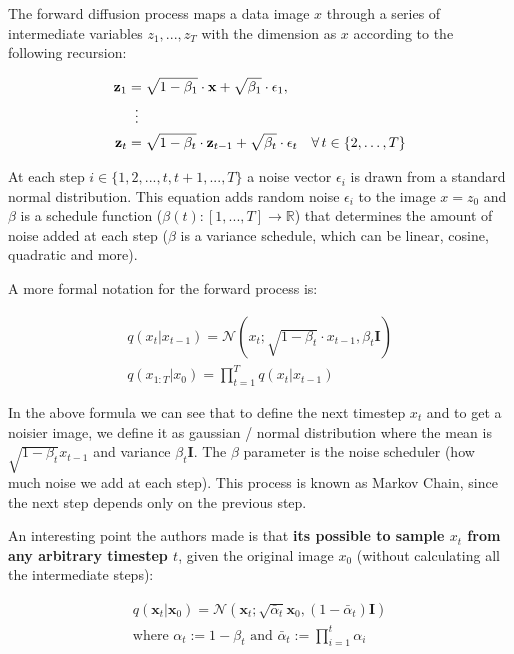 The forward diffusion process maps a data image $x$ through a series of intermediate variables $z_1, ..., z_T$ with the dimension as $x$ according to the following recursion:

\begin{equation}
    \begin{aligned}
    \mathbf{z}_1 &= \sqrt{1 - \beta_1} \cdot \mathbf{x} + \sqrt{\beta_1} \cdot \epsilon_1, \\
    &\;\;\vdots \notag \\
    \mathbf{z}_t &= \sqrt{1 - \beta_t} \cdot \mathbf{z}_{t-1} + \sqrt{\beta_t} \cdot \epsilon_t \quad \forall \, t \in \{2, \ldots, T\}
    \end{aligned}
\end{equation}

At each step $i \in \{1, 2, ..., t, t+1, ..., T\}$ a noise vector $\epsilon_i$ is drawn from a standard normal distribution. This equation adds random noise $\epsilon_i$ to the image $x = z_0$ and $\beta$ is a schedule function ($\beta(t):[1, ..., T] \rightarrow \mathbb{R}$) that determines the amount of noise added at each step ($\beta$ is a variance schedule, which can be linear, cosine, quadratic and more). 

A more formal notation for the forward process is:

\begin{equation*}
    \begin{aligned}
        q(x_t | x_{t-1}) = \mathcal{N}(x_t; \sqrt{1-\beta_t} \cdot x_{t-1}, \beta_t \mathbf{I}) \\
        q(x_{1:T} | x_0) = \prod_{t=1}^{T} q(x_t | x_{t-1})
    \end{aligned}
\end{equation*}

In the above formula we can see that to define the next timestep $x_t$ and to get a noisier image, we define it as gaussian / normal distribution where the mean is $\sqrt{1-\beta_t} x_{t-1}$ and variance $\beta_t \mathbf{I}$. The $\beta$ parameter is the noise scheduler (how much noise we add at each step). This process is known as Markov Chain, since the next step depends only on the previous step.

An interesting point the authors made is that \textbf{its possible to sample $x_t$ from any arbitrary timestep $t$}, given the original image $x_0$ (without calculating all the intermediate steps):

\begin{equation}
    \begin{aligned}
    q(\mathbf{x}_t|\mathbf{x}_0) = \mathcal{N}(\mathbf{x}_t; \sqrt{\bar{\alpha}_t}\mathbf{x}_0, (1 - \bar{\alpha}_t)\mathbf{I}) \\
    \text{where } \alpha_t := 1 - \beta_t \text{ and } \bar{\alpha}_t := \prod_{i=1}^{t} \alpha_i
    \end{aligned}
    \label{eq:forward_diffusion}
\end{equation}

